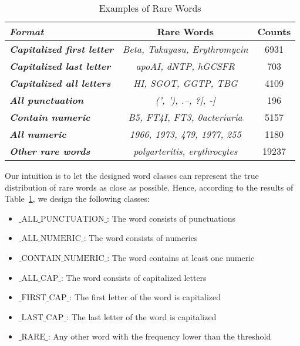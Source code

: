 \begin{table}[ht]  %
\centering  %
\caption{Examples of Rare Words}
\begin{tabular}{lcc}
\hline
\textbf{\textit{Format}} &    \textbf{Rare Words} & \textbf{Counts}\\
\hline
 \textbf{\textit{Capitalized first letter}}   & \textit{Beta, Takayasu, Erythromycin} & 6931\\
 \textbf{\textit{Capitalized last letter}} &  \textit{apoAI, dNTP, hGCSFR} & 703\\
 \textbf{\textit{Capitalized all letters}} &  \textit{HI, SGOT, GGTP, TBG} & 4109\\
 \textbf{\textit{All punctuation}} &  \textit{(', '), .--, ?], -]} & 196\\
 \textbf{\textit{Contain numeric}} &  \textit{B5, FT4I, FT3, 0acteriuria} & 5157\\
 \textbf{\textit{All numeric}} &  \textit{1966, 1973, 479, 1977, 255} & 1180 \\
 \textbf{\textit{Other rare words}} &  \textit{polyarteritis, erythrocytes} & 19237\\
\hline
\end{tabular}
\label{tab:exofrarewords}
\end{table}

Our intuition is to let the designed word classes can represent the true distribution of rare words as close as possible. Hence, according to the results of Table~\ref{tab:exofrarewords}, we design the following classes:

\begin{itemize}
\item $\text{\_ALL\_PUNCTUATION\_}$: The word consists of punctuations
\item $\text{\_ALL\_NUMERIC\_}$: The word consists of numerics
\item $\text{\_CONTAIN\_NUMERIC\_}$: The word contains at least one numeric
\item $\text{\_ALL\_CAP\_}$: The word consists of capitalized letters
\item $\text{\_FIRST\_CAP\_}$: The first letter of the word is capitalized
\item $\text{\_LAST\_CAP\_}$: The last letter of the word is capitalized
\item $\text{\_RARE\_}$: Any other word with the frequency lower than the threshold
\end{itemize}

